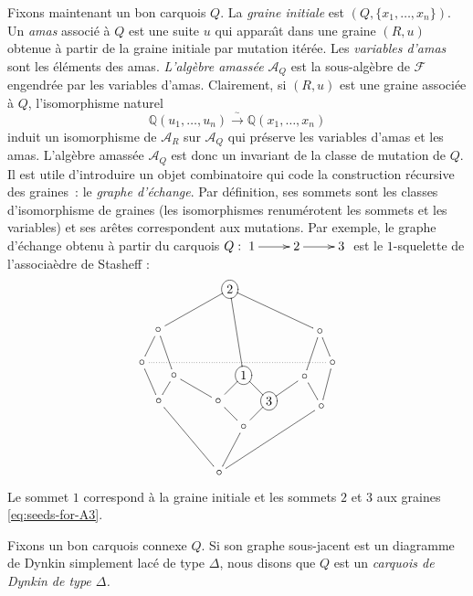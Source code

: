 \documentclass[brochure,12pt]{bourbaki}
\numberwithin{equation}{subsection}
\numberwithin{theorem}{section}
\newcommand{\Q}{\mathbb{Q}}
\newcommand{\iso}{\stackrel{_\sim}{\rightarrow}}
\newcommand{\ca}{{\mathcal A}}
\newcommand{\cF}{{\mathcal F}}
\begin{document}
Fixons maintenant un bon carquois $Q$. La {\em graine initiale} est
$(Q,\{x_1, \ldots, x_n\})$. Un {\em amas} associ\'e \`a $Q$ est une
suite $u$ qui appara\^{\i}t dans une graine $(R,u)$ obtenue \`a partir
de la graine initiale par mutation it\'er\'ee. Les {\em variables d'amas}
sont les \'el\'ements des amas. {\em L'alg\`ebre amass\'ee $\ca_Q$}
est la sous-alg\`ebre de $\cF$ engendr\'ee par les variables d'amas.
Clairement, si $(R,u)$ est une graine associ\'ee \`a $Q$, l'isomorphisme
naturel
\[
\Q(u_1, \ldots, u_n) \iso \Q(x_1, \ldots, x_n)
\]
induit un isomorphisme de $\ca_R$ sur $\ca_Q$ qui pr\'eserve
les variables d'amas et les amas. L'alg\`ebre amass\'ee $\ca_Q$ est
donc un invariant de la classe de mutation de $Q$. Il est utile
d'introduire un objet combinatoire qui code la construction
r\'ecursive des graines~: le {\em graphe d'\'echange}. Par d\'efinition,
ses sommets sont les classes d'isomorphisme de graines (les isomorphismes
renum\'erotent les sommets et les variables) et ses ar\^etes
correspondent aux mutations. Par exemple, le graphe d'\'echange
obtenu \`a partir du carquois
$
Q: \xymatrix{1 \ar[r] & 2 \ar[r] & 3}
$
est le $1$-squelette de l'associa\`edre de Stasheff
\cite{Stasheff63}
\cite{ChapotonFominZelevinsky02}:
\[
\begin{xy} 0;<0.4pt,0pt>:<0pt,-0.4pt>::
(173,0) *+<8pt>[o][F]{2} ="0",
(0,143) *+{\circ} ="1",
(63,168) *+{\circ} ="2",
(150,218) *+{\circ} ="3",
(250,218) *+<8pt>[o][F]{3} ="4",
(375,143) *+{\circ} ="5",
(350,82) *+{\circ} ="6",
(152,358) *+{\circ} ="7",
(200,168) *+<8pt>[o][F]{1} ="8",
(200,268) *+{\circ} ="9",
(32,79) *+{\circ} ="10",
(33,218) *+{\circ} ="11",
(320,170) *+{\circ} ="12",
(353,228) *+{\circ} ="13",
"0", {\ar@{-}"6"},
"0", {\ar@{-}"8"},
"0", {\ar@{-}"10"},
"1", {\ar@{.}"5"},
"1", {\ar@{-}"10"},
"11", {\ar@{-}"1"},
"2", {\ar@{-}"3"},
"10", {\ar@{-}"2"},
"2", {\ar@{-}"11"},
"3", {\ar@{-}"8"},
"9", {\ar@{-}"3"},
"8", {\ar@{-}"4"},
"4", {\ar@{-}"9"},
"4", {\ar@{-}"12"},
"6", {\ar@{-}"5"},
"5", {\ar@{-}"13"},
"12", {\ar@{-}"6"},
"9", {\ar@{-}"7"},
"11", {\ar@{-}"7"},
"13", {\ar@{-}"7"},
"13", {\ar@{-}"12"},
\end{xy}
\]
Le sommet $1$ correspond \`a la graine initiale et les sommets
$2$ et $3$ aux graines \ref{eq:seeds-for-A3}.

Fixons un bon carquois connexe $Q$. Si son graphe sous-jacent est
un diagramme de Dynkin simplement lac\'e de type $\Delta$, nous
disons que $Q$ est un {\em carquois de Dynkin de type $\Delta$.}
\end{document}
